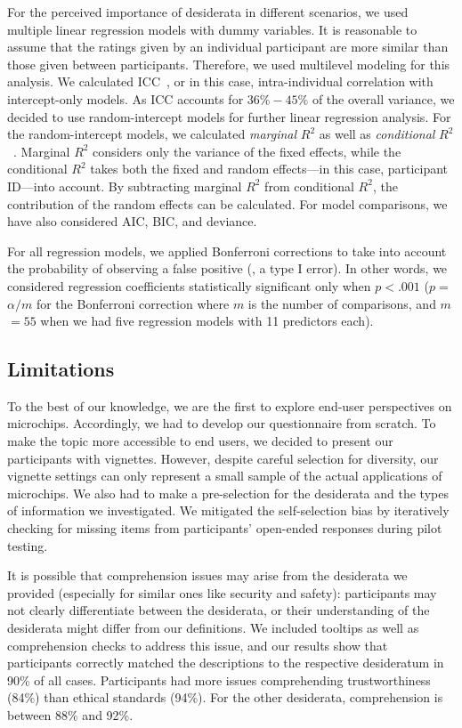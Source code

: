 For the perceived importance of desiderata in different scenarios, we used multiple linear regression models with dummy variables.
It is reasonable to assume that the ratings given by an individual participant are more similar than those given between participants. 
Therefore, we used multilevel modeling for this analysis.
We calculated \ac{ICC}~\cite{Koch2006}, or in this case, intra-individual correlation with intercept-only models. 
As \ac{ICC} accounts for $36\% - 45\%$ of the overall variance, we decided to use random-intercept models for further linear regression analysis.
For the random-intercept models, we calculated \textit{marginal} $R^2$ as well as \textit{conditional} $R^2$~\cite{Nakagawa2012}.
Marginal $R^2$ considers only the variance of the fixed effects, while the conditional $R^2$ takes both the fixed and random effects---in this case, participant ID---into account.
By subtracting marginal $R^2$ from conditional $R^2$, the contribution of the random effects can be calculated.
For model comparisons, we have also considered \ac{AIC}, \ac{BIC}, and deviance.

For all regression models, we applied Bonferroni corrections to take into account the probability of observing a false positive (\ie, a type I error).
In other words, we considered regression coefficients statistically significant only when $p$$<$$.001$ ($p$$=$$\alpha/m$ for the Bonferroni correction where $m$ is the number of comparisons, and $m$$=$$55$ when we had five regression models with 11 predictors each). 

\subsection{Limitations}
\label{xhw_study::subsec::limitations}
To the best of our knowledge, we are the first to explore end-user perspectives on microchips.
Accordingly, we had to develop our questionnaire from scratch.
To make the topic more accessible to end users, we decided to present our participants with vignettes.
However, despite careful selection for diversity, our vignette settings can only represent a small sample of the actual applications of microchips.
We also had to make a pre-selection for the desiderata and the types of information we investigated. 
We mitigated the self-selection bias by iteratively checking for missing items from participants' open-ended responses during pilot testing.

It is possible that comprehension issues may arise from the desiderata we provided (especially for similar ones like security and safety): participants may not clearly differentiate between the desiderata, or their understanding of the desiderata might differ from our definitions. 
We included tooltips as well as comprehension checks to address this issue, and our results show that participants correctly matched the descriptions to the respective desideratum in 90\% of all cases.
Participants had more issues comprehending trustworthiness (84\%) than ethical standards (94\%). 
For the other desiderata, comprehension is between 88\% and 92\%.

